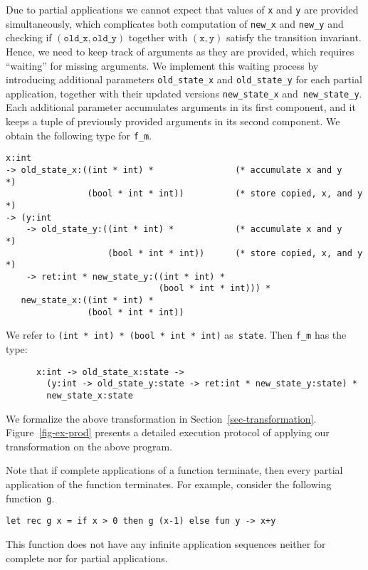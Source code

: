 Due to partial applications we cannot expect that values of \texttt{x}
and \texttt{y} are provided simultaneously, which complicates both
computation of \texttt{new\_x} and \texttt{new\_y} and checking if
$(\mathtt{old\_x}, \mathtt{old\_y})$ together with $(\mathtt{x},
\mathtt{y})$ satisfy the transition invariant. 
Hence, we need to keep track of arguments as they are provided, which
requires ``waiting'' for missing arguments.
We implement this waiting process by introducing additional parameters
\texttt{old\_state\_x} and \texttt{old\_state\_y} for each partial
application, together with their updated versions
\texttt{new\_state\_x} and~\texttt{new\_state\_y}.
Each additional parameter accumulates arguments in its first
component, and it keeps a tuple of previously provided arguments in
its second component. 
We obtain the following type for \texttt{f\_m}.
%
\begin{small}
\begin{verbatim}
x:int 
-> old_state_x:((int * int) *                (* accumulate x and y     *)
                (bool * int * int))          (* store copied, x, and y *)
-> (y:int 
    -> old_state_y:((int * int) *            (* accumulate x and y     *)    
                    (bool * int * int))      (* store copied, x, and y *)
    -> ret:int * new_state_y:((int * int) * 
                              (bool * int * int))) *
   new_state_x:((int * int) * 
                (bool * int * int))
\end{verbatim}
\end{small}
% 
We refer to \texttt{(int * int) * (bool * int * int)} as~\texttt{state}. 
Then \texttt{f\_m} has the type:
%
\begin{small}
\begin{verbatim}
      x:int -> old_state_x:state -> 
        (y:int -> old_state_y:state -> ret:int * new_state_y:state) *
        new_state_x:state
\end{verbatim}
\end{small}
% 
We formalize the above transformation in
Section~\ref{sec-transformation}. 
Figure~\ref{fig-ex-prod} presents a detailed execution protocol of
applying our transformation on the above program.

\iffalse
When dealing with unary applications, the binary reachability
analysis can show that every pair of unary applications is included
in a transition invariant using the following check.
\fi

Note that if complete applications of a function terminate, then every
partial application of the function terminates.
For example, consider the following function~\texttt{g}.
%
\begin{center}
\begin{verbatim}
let rec g x = if x > 0 then g (x-1) else fun y -> x+y
\end{verbatim}
\end{center}
%
This function does not have any infinite application sequences neither
for complete nor for partial applications.


